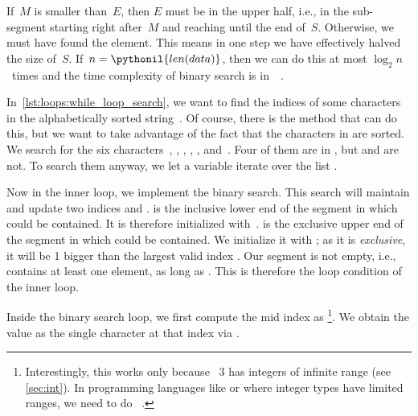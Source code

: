 If~$M$ is smaller than~$E$, then $E$ must be in the upper half, i.e., in the sub-segment starting right after~$M$ and reaching until the end of~$S$.
Otherwise, we must have found the element.
This means in one step we have effectively halved the size of~$S$.
If~$n=\pythonil{len(data)}$, then we can do this at most $\log_2 n$~times and the time complexity of binary search is in~~\cite{K1998SAS,H2024POIC:BS,B1999PP}.%
%
\begin{sloppypar}%
In~\cref{lst:loops:while_loop_search}, we want to find the indices of some characters in the alphabetically sorted string~.
Of course, there is the  method that can do this, but we want to take advantage of the fact that the characters in  are sorted.
We search for the six characters~, , , , , and~.
Four of them are in , but  and  are not.
To search them anyway, we let a variable  iterate over the list \pythonil{["a", "c", "o", "p", "w", "z"]}.%
\end{sloppypar}%
%
Now in the inner loop, we implement the binary search.
This search will maintain and update two indices  and .
 is the inclusive lower end of the segment in which  could be contained.
It is therefore initialized with~.
 is the exclusive upper end of the segment in which  could be contained.
We initialize it with ; as it is \emph{exclusive}, it will be 1 bigger than the largest valid index .
Our segment is not empty, i.e., contains at least one element, as long as .
This is therefore the loop condition of the inner loop.

Inside the binary search loop, we first compute the mid index as \footnote{%
Interestingly, this works only because \python~3 has integers of infinite range (see \cref{sec:int}). %
In programming languages like  or  where integer types have limited ranges, we need to do ~\cite{H2024POIC:BS}.%
}.
We obtain the value  as the single character at that index via .

